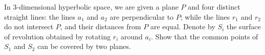 In 3-dimensional hyperbolic space, we are given a plane $P$ and four distinct straight lines: the lines $a_1$ and $a_2$ are perpendicular to $P$; while the lines $r_1$ and $r_2$ do not intersect $P$, and their distances from $P$ are equal. Denote by $S_i$ the surface of revolution obtained by rotating $r_i$ around $a_i$. Show that the common points of $S_1$ and $S_2$ can be covered by two planes.
